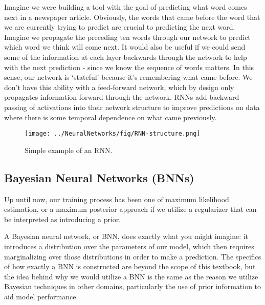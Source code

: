 Imagine we were building a tool with the goal of predicting what word comes next in a newspaper article. Obviously, the words that came before the word that we are currently trying to predict are crucial to predicting the next word. Imagine we propagate the preceding ten words through our network to predict which word we think will come next. It would also be useful if we could send some of the information at each layer backwards through the network to help with the next prediction - since we know the sequence of words matters. In this sense, our network is `stateful' because it's remembering what came before. We don't have this ability with a feed-forward network, which by design only propagates information forward through the network. RNNs add backward passing of activations into their network structure to improve predictions on data where there is some temporal dependence on what came previously.

\begin{figure}
    \centering
    \texttt{[image: ../NeuralNetworks/fig/RNN-structure.png]}
    \caption{Simple example of an RNN.}
    \label{fig:RNN-structre}
\end{figure}


\subsection{Bayesian Neural Networks (BNNs)}
Up until now, our training process has been one of maximum likelihood estimation, or a maximum posterior approach if we utilize a regularizer that can be interpreted as introducing a prior.

A Bayesian neural network, or BNN, does exactly what you might imagine: it introduces a distribution over the parameters of our model, which then requires marginalizing over those distributions in order to make a prediction. The specifics of how exactly a BNN is constructed are beyond the scope of this textbook, but the idea behind why we would utilize a BNN is the same as the reason we utilize Bayesian techniques in other domains, particularly the use of prior information to aid model performance.
